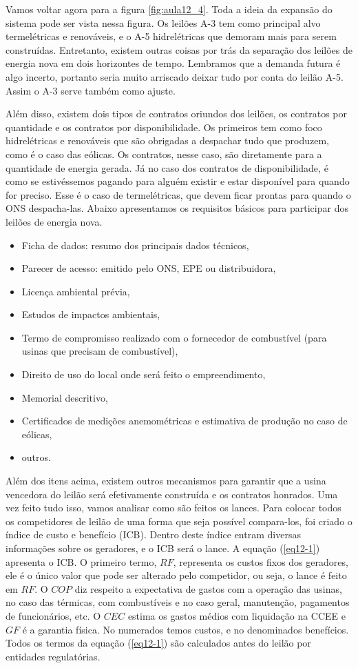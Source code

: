 Vamos voltar agora para a figura \ref{fig:aula12_4}. Toda a ideia da expansão do sistema pode ser vista nessa figura. Os leilões A-3 tem como principal alvo termelétricas e renováveis, e o A-5 hidrelétricas que demoram mais para serem construídas. Entretanto, existem outras coisas por trás da separação dos leilões de energia nova em dois horizontes de tempo. Lembramos que a demanda futura é algo incerto, portanto seria muito arriscado deixar tudo por conta do leilão A-5. Assim o A-3 serve também como ajuste. 

Além disso, existem dois tipos de contratos oriundos dos leilões, os contratos por quantidade e os contratos por disponibilidade. Os primeiros tem como foco hidrelétricas e renováveis que são obrigadas a despachar tudo que produzem, como é o caso das eólicas. Os contratos, nesse caso, são diretamente para a quantidade de energia gerada. Já no caso dos contratos de disponibilidade, é como se estivéssemos pagando para alguém existir e estar disponível para quando for preciso. Esse é o caso de termelétricas, que devem ficar prontas para quando o ONS despacha-las. Abaixo apresentamos os requisitos básicos para participar dos leilões de energia nova.

\begin{itemize}
\item Ficha de dados: resumo dos principais dados técnicos,
\item Parecer de acesso: emitido pelo ONS, EPE ou distribuidora,
\item Licença ambiental prévia,
\item Estudos de impactos ambientais,
\item Termo de compromisso realizado com o fornecedor de combustível (para usinas que precisam de combustível),
\item Direito de uso do local onde será feito o empreendimento,
\item Memorial descritivo,
\item Certificados de medições anemométricas e estimativa de produção no caso de eólicas,
\item outros.
\end{itemize}

Além dos itens acima, existem outros mecanismos para garantir que a usina vencedora do leilão será efetivamente construída e os contratos honrados. Uma vez feito tudo isso, vamos analisar como são feitos os lances. Para colocar todos os competidores de leilão de uma forma que seja possível compara-los, foi criado o índice de custo e benefício (ICB). Dentro deste índice entram diversas informações sobre os geradores, e o ICB será o lance. A equação (\ref{eq12-1}) apresenta o ICB. O primeiro termo, $RF$, representa os custos fixos dos geradores, ele é o único valor que pode ser alterado pelo competidor, ou seja, o lance é feito em $RF$. O $COP$ diz respeito a expectativa de gastos com a operação das usinas, no caso das térmicas, com combustíveis e no caso geral, manutenção, pagamentos de funcionários, etc. O $CEC$ estima os gastos médios com liquidação na CCEE e $GF$ é a garantia física. No numerados temos custos, e no denominados benefícios. Todos os termos da equação (\ref{eq12-1}) são calculados antes do leilão por entidades regulatórias. 

